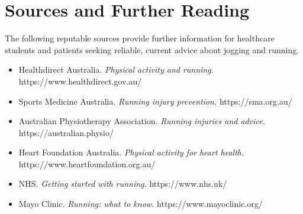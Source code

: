 \section*{Sources and Further Reading}
The following reputable sources provide further information for healthcare students and patients seeking reliable, current advice about jogging and running.
\begin{itemize}
    \item Healthdirect Australia. \textit{Physical activity and running.} https://www.healthdirect.gov.au/
    \item Sports Medicine Australia. \textit{Running injury prevention.} https://sma.org.au/
    \item Australian Physiotherapy Association. \textit{Running injuries and advice.} https://australian.physio/
    \item Heart Foundation Australia. \textit{Physical activity for heart health.} https://www.heartfoundation.org.au/
    \item NHS. \textit{Getting started with running.} https://www.nhs.uk/
    \item Mayo Clinic. \textit{Running: what to know.} https://www.mayoclinic.org/
\end{itemize}
